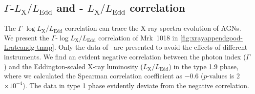 \subsection{$\Gamma$-$L_\mathrm{X}/L_\mathrm{Edd}$ and \alphaox- $L_\mathrm{X}/L_\mathrm{Edd}$ correlation}\label{subsec:xray-uv}
The $\Gamma$-$\log{L_\mathrm{X}/L_\mathrm{Edd}}$ correlation can trace the X-ray spectra evolution of AGNs. We present the $\Gamma$-$\log{L_\mathrm{X}/L_\mathrm{Edd}}$ correlation of Mrk~1018 in \autoref{fig:xrayappendgood-Lrateandg-tmap}. Only the data of \xrt\, are presented to avoid the effects of different instruments. We find an evident negative correlation between the photon index ($\Gamma$) and the Eddington-scaled X-ray luminosity ($L_\mathrm{X}/L_\mathrm{Edd}$) in the type 1.9 phase, where we calculated the Spearman correlation coefficient as $-0.6$ ($p$-values is 2$\times10^{-4}$). The data in type 1 phase evidently deviate from the negative correlation. 




